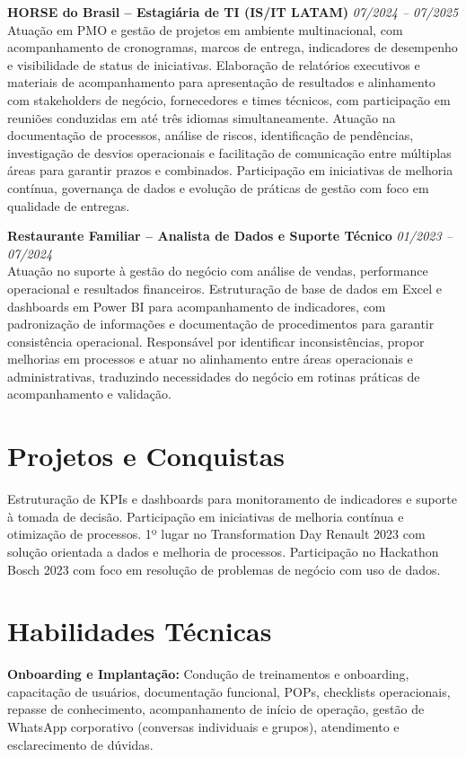 \documentclass[11pt,a4paper]{article}
\newcommand{\experience}[3]{%
  \textbf{#1} \hfill \textit{#2}\\[4pt]
  #3
  \vspace{8pt}
}
\begin{document}
\experience{HORSE do Brasil -- Estagiária de TI (IS/IT LATAM)}{07/2024 -- 07/2025}{%
Atuação em PMO e gestão de projetos em ambiente multinacional, com acompanhamento de cronogramas, marcos de entrega, indicadores de desempenho e visibilidade de status de iniciativas. Elaboração de relatórios executivos e materiais de acompanhamento para apresentação de resultados e alinhamento com stakeholders de negócio, fornecedores e times técnicos, com participação em reuniões conduzidas em até três idiomas simultaneamente. Atuação na documentação de processos, análise de riscos, identificação de pendências, investigação de desvios operacionais e facilitação de comunicação entre múltiplas áreas para garantir prazos e combinados. Participação em iniciativas de melhoria contínua, governança de dados e evolução de práticas de gestão com foco em qualidade de entregas.}

\experience{Restaurante Familiar -- Analista de Dados e Suporte Técnico}{01/2023 -- 07/2024}{%
Atuação no suporte à gestão do negócio com análise de vendas, performance operacional e resultados financeiros. Estruturação de base de dados em Excel e dashboards em Power BI para acompanhamento de indicadores, com padronização de informações e documentação de procedimentos para garantir consistência operacional. Responsável por identificar inconsistências, propor melhorias em processos e atuar no alinhamento entre áreas operacionais e administrativas, traduzindo necessidades do negócio em rotinas práticas de acompanhamento e validação.}

\section*{Projetos e Conquistas}

Estruturação de KPIs e dashboards para monitoramento de indicadores e suporte à tomada de decisão. Participação em iniciativas de melhoria contínua e otimização de processos. 1º lugar no Transformation Day Renault 2023 com solução orientada a dados e melhoria de processos. Participação no Hackathon Bosch 2023 com foco em resolução de problemas de negócio com uso de dados.

\section*{Habilidades Técnicas}

\textbf{Onboarding e Implantação:} Condução de treinamentos e onboarding, capacitação de usuários, documentação funcional, POPs, checklists operacionais, repasse de conhecimento, acompanhamento de início de operação, gestão de WhatsApp corporativo (conversas individuais e grupos), atendimento e esclarecimento de dúvidas.
\end{document}
